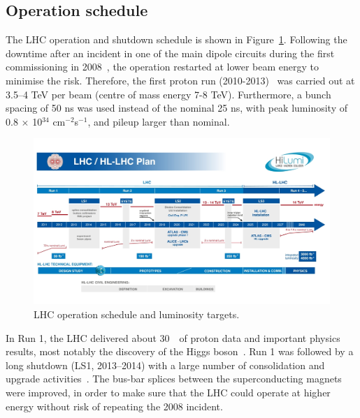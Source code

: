 \subsection{Operation schedule}
\label{sec:Operation schedule}
The LHC operation and shutdown schedule is shown 
in Figure~\ref{fig:LHC-schedule-lumi}.
Following the downtime after an incident in one of the main dipole circuits 
during the first commissioning in 2008~\cite{lebrun2009report},
the operation restarted at lower beam energy to minimise the risk. 
Therefore, the first proton run (2010-2013)~\cite{alemany2013operation} was
carried out at 3.5–4 TeV per beam (centre of mass energy 7-8 TeV). 
Furthermore, a bunch spacing of 50 ns was used instead of the nominal 25 ns,
with peak luminosity of 0.8 $\times$ 10$^{34}$ cm$^{-2}$s$^{-1}$, 
and pileup larger than nominal. 

\begin{figure}[bht]
	\begin{centering}
	\includegraphics[width=.95\textwidth]{Detector/plots/LHC-schedule-lumi.jpg}
	\caption{LHC operation schedule and luminosity targets.  %
		}
	\label{fig:LHC-schedule-lumi}
	\end{centering}
\end{figure}
In Run 1, the LHC delivered about 30~\fb\ of proton data and important physics results,
most notably the discovery of the Higgs boson~\cite{HIGG-2012-27,HIGG-2012-28}.
Run 1 was followed by a long shutdown (LS1, 2013–2014)
with a large number of consolidation and upgrade activities~\cite{bordry2013first}. 	
The bus-bar splices between the superconducting magnets were improved, 
in order to make sure that the LHC could operate at higher energy 
without risk of repeating the 2008 incident. 

